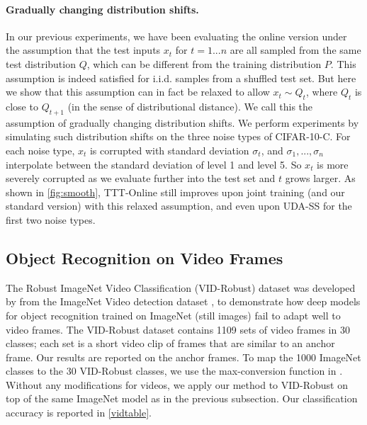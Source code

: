 \paragraph{Gradually changing distribution shifts.}
In our previous experiments, we have been evaluating the online version under the assumption that the test inputs $x_t$ for $t=1...n$ are all sampled from the same test distribution $Q$, which can be different from the training distribution $P$. 
This assumption is indeed satisfied for i.i.d. samples from a shuffled test set.
But here we show that this assumption can in fact be relaxed to allow $x_t\sim Q_t$, where $Q_t$ is close to $Q_{t+1}$ (in the sense of distributional distance).
We call this the assumption of gradually changing distribution shifts. We perform experiments by simulating such distribution shifts on the three noise types of CIFAR-10-C. For each noise type, $x_t$ is corrupted with standard deviation $\sigma_t$, and $\sigma_1,...,\sigma_n$ interpolate between the standard deviation of level 1 and level 5. So $x_t$ is more severely corrupted as we evaluate further into the test set and $t$ grows larger.
As shown in \autoref{fig:smooth}, 
TTT-Online still improves upon joint training (and our standard version) with this relaxed assumption, and even upon UDA-SS for the first two noise types.



\subsection{Object Recognition on Video Frames}
\label{ivc}
The Robust ImageNet Video Classification (VID-Robust) dataset was developed by \citet{shankar2019systematic} from the ImageNet Video detection dataset \citep{ILSVRC15}, to demonstrate how deep models for object recognition trained on ImageNet (still images) fail to adapt well to video frames. The VID-Robust dataset contains 1109 sets of video frames in 30 classes; each set is a short video clip of frames that are similar to an anchor frame. Our results are reported on the anchor frames. To map the 1000 ImageNet classes to the 30 VID-Robust classes, we use the max-conversion function in \citet{shankar2019systematic}.
Without any modifications for videos, we apply our method to VID-Robust on top of the same ImageNet model as in the previous subsection. 
Our classification accuracy is reported in \autoref{vidtable}. 

